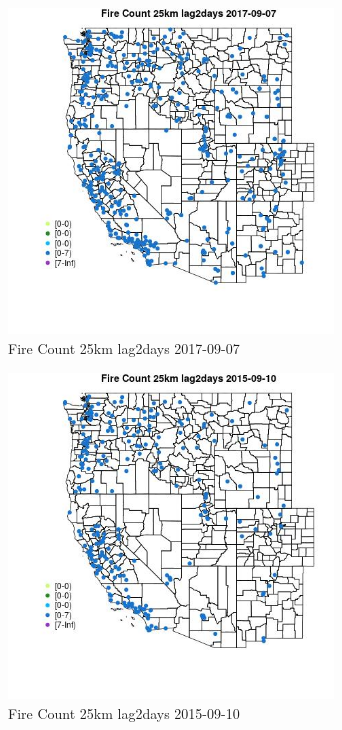 \begin{figure} 
\centering  
\includegraphics[width=0.77\textwidth]{Code_Outputs/Report_ML_input_PM25_Step4_part_e_de_duplicated_aves_compiled_2019-05-20wNAs_MapObsFire_Count_25km_lag2days2017-09-07.jpg} 
\caption{\label{fig:Report_ML_input_PM25_Step4_part_e_de_duplicated_aves_compiled_2019-05-20wNAsMapObsFire_Count_25km_lag2days2017-09-07}Fire Count 25km lag2days 2017-09-07} 
\end{figure} 
 

\begin{figure} 
\centering  
\includegraphics[width=0.77\textwidth]{Code_Outputs/Report_ML_input_PM25_Step4_part_e_de_duplicated_aves_compiled_2019-05-20wNAs_MapObsFire_Count_25km_lag2days2015-09-10.jpg} 
\caption{\label{fig:Report_ML_input_PM25_Step4_part_e_de_duplicated_aves_compiled_2019-05-20wNAsMapObsFire_Count_25km_lag2days2015-09-10}Fire Count 25km lag2days 2015-09-10} 
\end{figure} 
 

